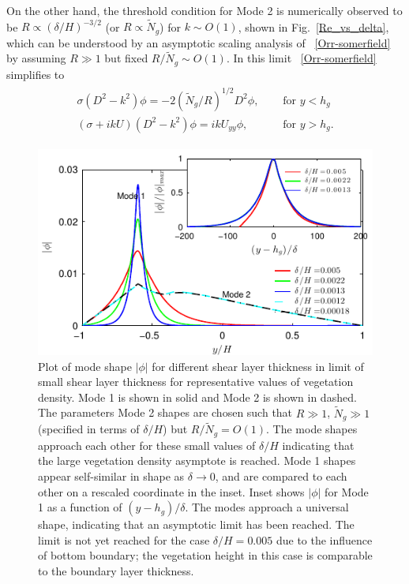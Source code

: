\documentclass[aps,preprint,12pt]{revtex4-1}  %
\newcommand{\hg}{h_g}
\newcommand{\Rey}{{R}}
\newcommand{\Ndg}{\tilde{N}_g}
\begin{document}
On the other hand, the threshold condition for Mode 2 is numerically observed to be $\Rey \propto ({\delta}/{H})^{-3/2}$ (or $\Rey \propto \Ndg$) for $k\sim O(1)$, shown in Fig.~\ref{Re_vs_delta}, which can be understood by an asymptotic scaling analysis of ~\eqref{Orr-somerfield} by assuming $\Rey \gg 1$ but fixed $\Rey/\Ndg \sim O(1)$.
In this limit ~\eqref{Orr-somerfield} simplifies to 
\begin{align}
\begin{split}
\sigma\left(D^2-k^2\right)\phi = -2{(\Ndg/\Rey)^{1/2}}D^2\phi,  \quad &\text{ for $y<\hg$}  \\
\left(\sigma+ikU\right) \left(D^2-k^2\right)\phi =  ikU_{yy}\phi, \quad &\text{ for $y>\hg$}.
\end{split}
\label{eqn:mode2asymp}
\end{align}
\begin{figure}
\includegraphics[]{Asymptotic_noshear}
\caption{Plot of mode shape $|\phi|$ for different shear layer thickness in limit of small shear layer thickness for representative values of vegetation density. 
Mode 1 is shown in solid and Mode 2 is shown in dashed. The parameters Mode 2 shapes are chosen such that $\Rey \gg 1$, $\Ndg \gg 1$ (specified in terms of $\delta/H$) but $\Rey/\Ndg = O(1)$. 
The mode shapes approach each other for these small values of $\delta/H$ indicating that the large vegetation density asymptote is reached. Mode 1 shapes appear self-similar in shape as $\delta\to 0$, 
and are compared to each other on a rescaled coordinate in the inset. 
Inset shows $|\phi|$ for Mode 1 as a function of $(y-\hg)/\delta$. The modes approach a universal shape, indicating that an asymptotic limit has been reached. 
The limit is not yet reached for the case $\delta/H = 0.005$ due to the influence of bottom boundary; the vegetation height in this case is comparable to the boundary layer thickness.}
\label{Asymptotic_mode}
\end{figure}
\end{document}
